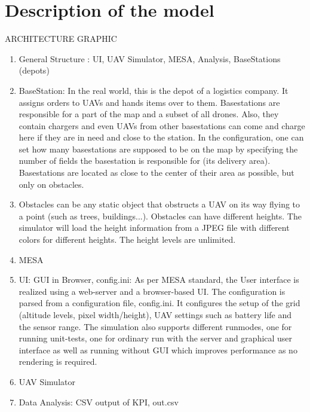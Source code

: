 \section{Description of the model}
ARCHITECTURE GRAPHIC
\begin{enumerate}
	\item General Structure :  UI, UAV Simulator, MESA, Analysis, BaseStations (depots)
	\item BaseStation: In the real world, this is the depot of a logistics company. It assigns orders to UAVs and hands items over to them. Basestations are responsible for a part of the map and a subset of all drones. Also, they contain chargers and even UAVs from other basestations can come and charge here if they are in need and close to the station. In the configuration, one can set how many basestations are supposed to be on the map by specifying the number of fields the basestation is responsible for (its delivery area). Basestations are located as close to the center of their area as possible, but only on obstacles.
		\item Obstacles can be any static object that obstructs a UAV on its way flying to a point (such as trees, buildings...). Obstacles can have different heights. The simulator will load the height information from a JPEG file with different colors for different heights. The height levels are unlimited. 
	\item MESA
	\item UI: GUI in Browser, config.ini: As per MESA standard, the User interface is realized using a web-server and a browser-based UI. The configuration is parsed from a configuration file,  config.ini. It configures the setup of the grid (altitude levels, pixel width/height), UAV settings such as battery life and the sensor range. The simulation also supports different runmodes, one for running unit-tests, one for ordinary run with the server and graphical user interface as well as running without GUI which improves performance as no rendering is required.
	\item UAV Simulator
	\item Data Analysis: CSV output of KPI, out.csv
\end{enumerate}

